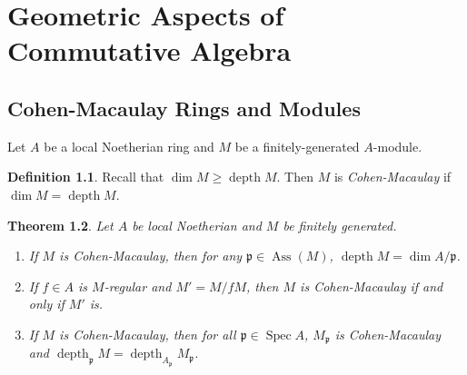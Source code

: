 \documentclass[leqno, openany]{memoir}
\newtheorem{thm}{Theorem}[section]
\theoremstyle{definition}
\newtheorem{defn}[thm]{Definition}
\theoremstyle{remark}
\theoremstyle{plain}
\theoremstyle{definition}
\theoremstyle{remark}
\newcommand{\mf}[1]{\mathfrak{#1}}
\DeclareMathOperator{\Spec}{Spec}
\DeclareMathOperator{\Ass}{Ass}
\DeclareMathOperator{\dpth}{depth}
\begin{document}
\chapter{Geometric Aspects of Commutative Algebra}%
\label{cha:normal_and_regular_rings}

\section{Cohen-Macaulay Rings and Modules}%
\label{sec:cohen_macaulay_rings_and_modules}

Let $A$ be a local Noetherian ring and $M$ be a finitely-generated $A$-module. 

\begin{defn}
    Recall that $\dim M \geq \dpth M$. Then $M$ is \textit{Cohen-Macaulay} if $\dim M = \dpth M$. 
\end{defn}

\begin{thm}
    Let $A$ be local Noetherian and $M$ be finitely generated.
    \begin{enumerate}
        \item If $M$ is Cohen-Macaulay, then for any $\mf{p} \in \Ass(M)$, $\dpth M = \dim A/\mf{p}$.
        \item If $f \in A$ is $M$-regular and $M' = M/fM$, then $M$ is Cohen-Macaulay if and only if $M'$ is.
        \item If $M$ is Cohen-Macaulay, then for all $\mf{p} \in \Spec A$, $M_{\mf{p}}$ is Cohen-Macaulay and $\dpth_{\mf{p}} M = \dpth_{A_{\mf{p}}} M_{\mf{p}}$.
    \end{enumerate}
\end{thm}
\end{document}
